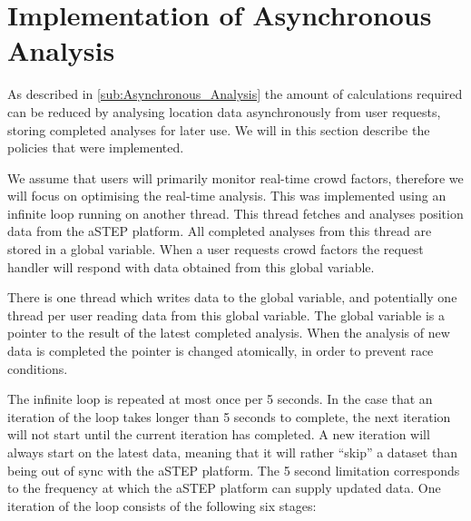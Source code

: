 \section{Implementation of Asynchronous Analysis}
\label{sub:implementation_of_asynchronous_analysis}
As described in \cref{sub:Asynchronous_Analysis} the amount of calculations required can be reduced by analysing location data asynchronously from user requests, storing completed analyses for later use. We will in this section describe the policies that were implemented. 

We assume that users will primarily monitor real-time crowd factors, therefore we will focus on optimising the real-time analysis. This was implemented using an infinite loop running on another thread. This thread fetches and analyses position data from the aSTEP platform. All completed analyses from this thread are stored in a global variable. When a user requests crowd factors the request handler will respond with data obtained from this global variable.

There is one thread which writes data to the global variable, and potentially one thread per user reading data from this global variable. The global variable is a pointer to the result of the latest completed analysis. When the analysis of new data is completed the pointer is changed atomically, in order to prevent race conditions.

The infinite loop is repeated at most once per 5 seconds. In the case that an iteration of the loop takes longer than 5 seconds to complete, the next iteration will not start until the current iteration has completed. A new iteration will always start on the latest data, meaning that it will rather \enquote{skip} a dataset than being out of sync with the aSTEP platform. The 5 second limitation corresponds to the frequency at which the aSTEP platform can supply updated data. One iteration of the loop consists of the following six stages: 

